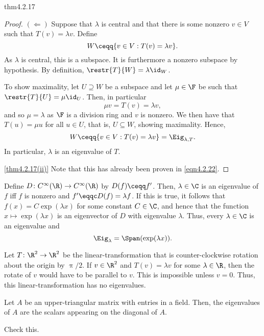 \begin{thm}{}{thm4.2.17}
\begin{proof}
		\blni
		$(\Leftarrow )$ Suppose that $\lambda$ is central and that there is some nonzero $v\in V$ such that $T(v)=\lambda v$.  Define
		\begin{equation}
			W\ceqq \{ v\in V:T(v)=\lambda v\} .
		\end{equation}
		As $\lambda$ is central, this is a subspace.  It is furthermore a nonzero subspace by hypothesis.  By definition, $\restr{T}{W}=\lambda \id _W$.
		
		To show maximality, let $U\supseteq W$ be a subspace and let $\mu \in \F$ be such that $\restr{T}{U}=\mu \id _U$.  Then, in particular
		\begin{equation}
			\mu v=T(v)=\lambda v,
		\end{equation}
		and so $\mu =\lambda$ as $\F$ is a division ring and $v$ is nonzero.  We then have that $T(u)=\mu u$ for all $u\in U$, that is, $U\subseteq W$, showing maximality.  Hence,
		\begin{equation}\label{eqn4.2.22}
			W\ceqq \{ v\in V:T(v)=\lambda v\} =\Eig _{\lambda ,T}.
		\end{equation}
		In particular, $\lambda$ is an eigenvalue of $T$.
		
		\blni
		\cref{thm4.2.17(ii)} Note that this has already been proven in \eqref{eqn4.2.22}.
	\end{proof}
\end{thm}

\begin{exm}{}{}
	Define $D\colon C^{\infty}(\R )\rightarrow C^{\infty}(\R )$ by $D(f)\ceqq f'$.  Then, $\lambda \in \C$ is an eigenvalue of $f$ iff $f$ is nonzero and $f'\eqqc D(f)=\lambda f$.  If this is true, it follows that $f(x)=C\exp (\lambda x)$ for some constant $C\in \C$, and hence that the function $x\mapsto \exp (\lambda x)$ is an eigenvector of $D$ with eigenvalue $\lambda$.  Thus, every $\lambda \in \C$ is an eigenvalue and
	\begin{equation}
		\Eig _{\lambda}=\Span (\exp (\lambda x)).
	\end{equation}
\end{exm}
\begin{exm}{}{}
	Let $T\colon \R ^2\rightarrow \R ^2$ be the linear-transformation that is counter-clockwise rotation about the origin by $\uppi /2$.  If $v\in \R ^2$ and $T(v)=\lambda v$ for some $\lambda \in \R$, then the rotate of $v$ would have to be parallel to $v$.  This is impossible unless $v=0$.  Thus, this linear-transformation has no eigenvalues.
\end{exm}
\begin{exm}{}{}
	Let $A$ be an upper-triangular matrix with entries in a field.  Then, the eigenvalues of $A$ are the scalars appearing on the diagonal of $A$.
	\begin{exr}[breakable=false]{}{}
		Check this.
	\end{exr}
\end{exm}

